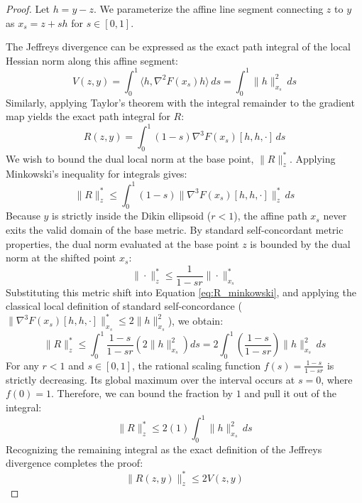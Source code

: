 \begin{proof}
Let $h = y - z$. We parameterize the affine line segment connecting $z$ to $y$ as $x_s = z + sh$ for $s \in [0, 1]$. 

The Jeffreys divergence can be expressed as the exact path integral of the local Hessian norm along this affine segment:
\begin{equation}
    V(z, y) = \int_0^1 \langle h, \nabla^2 F(x_s) h \rangle \, ds = \int_0^1 \|h\|_{x_s}^2 \, ds
\end{equation}
Similarly, applying Taylor's theorem with the integral remainder to the gradient map yields the exact path integral for $R$:
\begin{equation}
    R(z, y) = \int_0^1 (1-s) \nabla^3 F(x_s)[h, h, \cdot] \, ds
\end{equation}
We wish to bound the dual local norm at the base point, $\|R\|_z^*$. Applying Minkowski's inequality for integrals gives:
\begin{equation} \label{eq:R_minkowski}
    \|R\|_z^* \le \int_0^1 (1-s) \|\nabla^3 F(x_s)[h, h, \cdot]\|_z^* \, ds
\end{equation}
Because $y$ is strictly inside the Dikin ellipsoid ($r < 1$), the affine path $x_s$ never exits the valid domain of the base metric. By standard self-concordant metric properties, the dual norm evaluated at the base point $z$ is bounded by the dual norm at the shifted point $x_s$:
\begin{equation}
    \|\cdot\|_z^* \le \frac{1}{1-sr} \|\cdot\|_{x_s}^*
\end{equation}
Substituting this metric shift into Equation \ref{eq:R_minkowski}, and applying the classical local definition of standard self-concordance ($\|\nabla^3 F(x_s)[h, h, \cdot]\|_{x_s}^* \le 2\|h\|_{x_s}^2$), we obtain:
\begin{equation}
    \|R\|_z^* \le \int_0^1 \frac{1-s}{1-sr} \left( 2\|h\|_{x_s}^2 \right) ds = 2 \int_0^1 \left( \frac{1-s}{1-sr} \right) \|h\|_{x_s}^2 \, ds
\end{equation}
For any $r < 1$ and $s \in [0, 1]$, the rational scaling function $f(s) = \frac{1-s}{1-sr}$ is strictly decreasing. Its global maximum over the interval occurs at $s=0$, where $f(0) = 1$. Therefore, we can bound the fraction by $1$ and pull it out of the integral:
\begin{equation}
    \|R\|_z^* \le 2(1) \int_0^1 \|h\|_{x_s}^2 \, ds
\end{equation}
Recognizing the remaining integral as the exact definition of the Jeffreys divergence completes the proof:
\begin{equation}
    \|R(z, y)\|^*_z \le 2 V(z, y)
\end{equation}
\end{proof}

